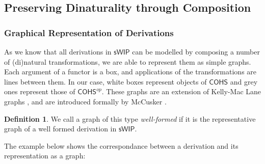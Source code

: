 \documentclass[11pt, oneside]{article}
\theoremstyle{plain}
\theoremstyle{definition}
\newtheorem{definition}[theorem]{Definition}
\newcommand{\sSys}{{\mathsf{sWIP}}}%
\newcommand{\cohs}{{\mathsf{COHS}}}
\begin{document}
\subsection{Preserving Dinaturality through Composition}

\subsubsection{Graphical Representation of Derivations}
As we know that all derivations in $\sSys$ can be modelled by composing a number of (di)natural transformations, we are able to represent them as simple graphs.
Each argument of a functor is a box, and applications of the transformations are lines between them.
In our case, white boxes represent objects of $\cohs$ and grey ones represent those of $\cohs^{op}$.
These graphs are an extension of Kelly-Mac Lane graphs \cite{mac2013categories}, and are introduced formally by McCusker \cite{mccusker2018compositionality}.

\begin{definition}
We call a graph of this type \textit{well-formed} if it is the representative graph of a well formed derivation in $\sSys$.
\end{definition}
The example below shows the correspondance between a derivation and its representation as a graph:
\end{document}
